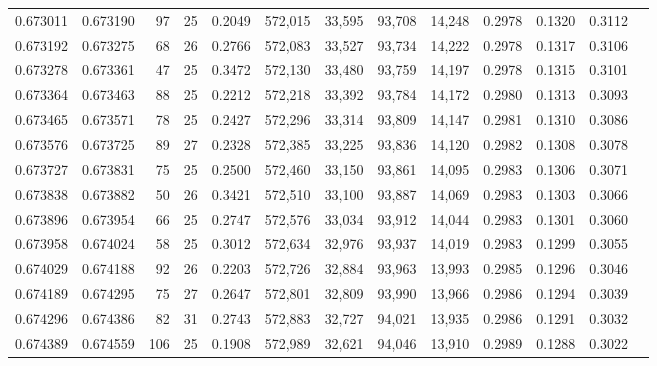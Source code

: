 \begin{tabular}{rrrrrrrrrrrrr}
0.673011 & 0.673190 &  97 &  25 &                                     0.2049 & 572,015 &  33,595 &  93,708 &  14,248 & 0.2978 & 0.1320 & 0.3112 \\
0.673192 & 0.673275 &  68 &  26 &                                     0.2766 & 572,083 &  33,527 &  93,734 &  14,222 & 0.2978 & 0.1317 & 0.3106 \\
0.673278 & 0.673361 &  47 &  25 &                                     0.3472 & 572,130 &  33,480 &  93,759 &  14,197 & 0.2978 & 0.1315 & 0.3101 \\
0.673364 & 0.673463 &  88 &  25 &                                     0.2212 & 572,218 &  33,392 &  93,784 &  14,172 & 0.2980 & 0.1313 & 0.3093 \\
0.673465 & 0.673571 &  78 &  25 &                                     0.2427 & 572,296 &  33,314 &  93,809 &  14,147 & 0.2981 & 0.1310 & 0.3086 \\
0.673576 & 0.673725 &  89 &  27 &                                     0.2328 & 572,385 &  33,225 &  93,836 &  14,120 & 0.2982 & 0.1308 & 0.3078 \\
0.673727 & 0.673831 &  75 &  25 &                                     0.2500 & 572,460 &  33,150 &  93,861 &  14,095 & 0.2983 & 0.1306 & 0.3071 \\
0.673838 & 0.673882 &  50 &  26 &                                     0.3421 & 572,510 &  33,100 &  93,887 &  14,069 & 0.2983 & 0.1303 & 0.3066 \\
0.673896 & 0.673954 &  66 &  25 &                                     0.2747 & 572,576 &  33,034 &  93,912 &  14,044 & 0.2983 & 0.1301 & 0.3060 \\
0.673958 & 0.674024 &  58 &  25 &                                     0.3012 & 572,634 &  32,976 &  93,937 &  14,019 & 0.2983 & 0.1299 & 0.3055 \\
0.674029 & 0.674188 &  92 &  26 &                                     0.2203 & 572,726 &  32,884 &  93,963 &  13,993 & 0.2985 & 0.1296 & 0.3046 \\
0.674189 & 0.674295 &  75 &  27 &                                     0.2647 & 572,801 &  32,809 &  93,990 &  13,966 & 0.2986 & 0.1294 & 0.3039 \\
0.674296 & 0.674386 &  82 &  31 &                                     0.2743 & 572,883 &  32,727 &  94,021 &  13,935 & 0.2986 & 0.1291 & 0.3032 \\
0.674389 & 0.674559 & 106 &  25 &                                     0.1908 & 572,989 &  32,621 &  94,046 &  13,910 & 0.2989 & 0.1288 & 0.3022 \\

\end{tabular}
